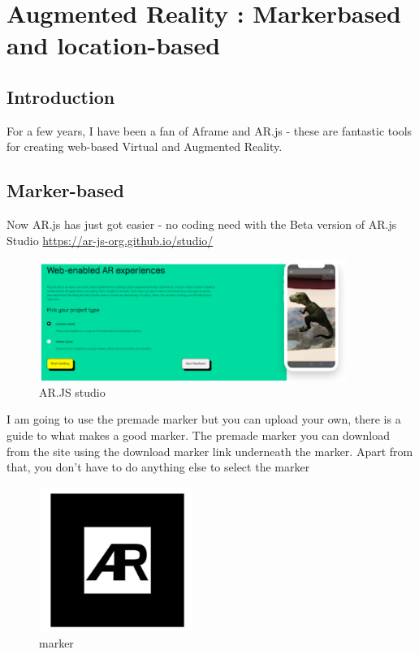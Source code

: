 \chapter{Augmented Reality : Markerbased and location-based}

\section{Introduction}
For a few years, I have been a fan of Aframe and AR.js - these are fantastic tools for creating web-based Virtual and Augmented Reality.

\section{Marker-based}
Now AR.js has just got easier - no coding need with the Beta version of AR.js Studio \url{https://ar-js-org.github.io/studio/}

\begin{figure}
    \centering
    \includegraphics[width=10cm]{chapters/ChapterAR/webar1.png}
    \caption{AR.JS studio}
    \label{fig:arjsstudio}
\end{figure}

I am going to use the premade marker but you can upload your own, there is a guide to what makes a good marker. The premade marker you can download from the site using the download marker link underneath the marker. Apart from that, you don't have to do anything else to select the marker
\begin{figure}
    \centering
    \includegraphics[width=5cm]{chapters/ChapterAR/webar6.png}
    \caption{marker}
    \label{fig:marker}
\end{figure}

